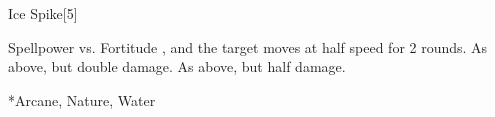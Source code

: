 \begin{spellsection}{Ice Spike}[5]
    \begin{spellheader}
    \end{spellheader}
    \begin{spellcontent}
        \begin{spelltargetinginfo}
        \end{spelltargetinginfo}
        \begin{spelleffects}
            \begin{spellattack}{Spellpower vs. Fortitude}
                \spellsuccess {}, and the target moves at half speed for 2 rounds.
                \spellcritical As above, but double damage.
                \spellfailure As above, but half damage.
            \end{spellattack}
        \end{spelleffects}
    \end{spellcontent}
    \begin{spellfooter}
        *{Arcane, Nature, Water}
        \miscastexplode
    \end{spellfooter}
    \begin{spellaugments}
    \end{spellaugments}
\end{spellsection}

